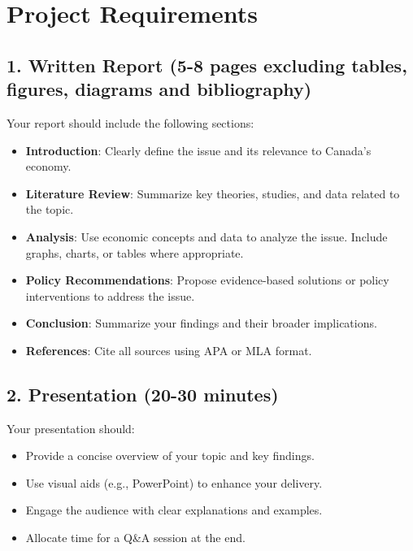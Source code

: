 \documentclass[12pt]{article}
\begin{document}
\section*{Project Requirements}
\subsection*{1. Written Report (5-8 pages excluding tables, figures, diagrams and bibliography)}
Your report should include the following sections:
\begin{itemize}
    \item \textbf{Introduction}: Clearly define the issue and its relevance to Canada’s economy.
    \item \textbf{Literature Review}: Summarize key theories, studies, and data related to the topic.
    \item \textbf{Analysis}: Use economic concepts and data to analyze the issue. Include graphs, charts, or tables where appropriate.
    \item \textbf{Policy Recommendations}: Propose evidence-based solutions or policy interventions to address the issue.
    \item \textbf{Conclusion}: Summarize your findings and their broader implications.
    \item \textbf{References}: Cite all sources using APA or MLA format.
\end{itemize}

\subsection*{2. Presentation (20-30 minutes)}
Your presentation should:
\begin{itemize}
    \item Provide a concise overview of your topic and key findings.
    \item Use visual aids (e.g., PowerPoint) to enhance your delivery.
    \item Engage the audience with clear explanations and examples.
    \item Allocate time for a Q\&A session at the end.
\end{itemize}
\end{document}
